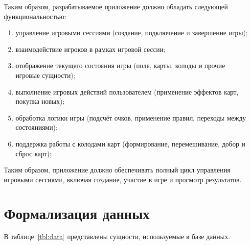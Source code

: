 Таким образом, разрабатываемое приложение должно обладать следующей функциональностью:
\begin{enumerate}
    \item управление игровыми сессиями (создание, подключение и завершение игры);
    \item взаимодействие игроков в рамках игровой сессии;
    \item отображение текущего состояния игры (поле, карты, колоды и прочие игровые сущности);
    \item выполнение игровых действий пользователем (применение эффектов карт, покупка новых);
    \item обработка логики игры (подсчёт очков, применение правил, переходы между состояниями);
    \item поддержка работы с колодами карт (формирование, перемешивание, добор и сброс карт);
\end{enumerate}

Таким образом, приложение должно обеспечивать полный цикл управления игровыми сессиями, включая создание, участие в игре и просмотр результатов.


\section{Формализация данных}

В таблице~\ref{tbl:data} представлены сущности, используемые в базе данных.

